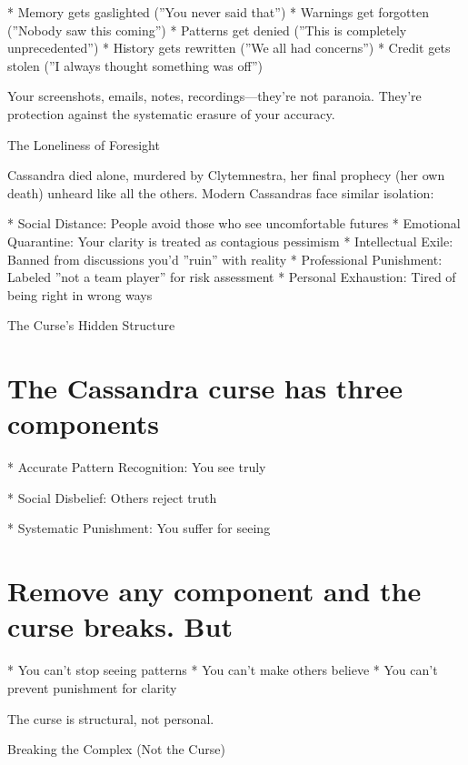 \documentclass[12pt,oneside]{book}
\begin{document}
                    * Memory gets gaslighted (''You never said that'')
                    * Warnings get forgotten (''Nobody saw this coming'')
                    * Patterns get denied (''This is completely unprecedented'')
                    * History gets rewritten (''We all had concerns'')
                    * Credit gets stolen (''I always thought something was off'')

Your screenshots, emails, notes, recordings---they're not paranoia. They're protection against the systematic erasure of your accuracy.

The Loneliness of Foresight

Cassandra died alone, murdered by Clytemnestra, her final prophecy (her own death) unheard like all the others. Modern Cassandras face similar isolation:

                    * Social Distance: People avoid those who see uncomfortable futures
                    * Emotional Quarantine: Your clarity is treated as contagious pessimism
                    * Intellectual Exile: Banned from discussions you'd ''ruin'' with reality
                    * Professional Punishment: Labeled ''not a team player'' for risk assessment
                    * Personal Exhaustion: Tired of being right in wrong ways

The Curse's Hidden Structure

\section{The Cassandra curse has three components}

                    * Accurate Pattern Recognition: You see truly

                    * Social Disbelief: Others reject truth

                    * Systematic Punishment: You suffer for seeing

\section{Remove any component and the curse breaks. But}

                    * You can't stop seeing patterns
                    * You can't make others believe
                    * You can't prevent punishment for clarity

The curse is structural, not personal.

Breaking the Complex (Not the Curse)
\end{document}
